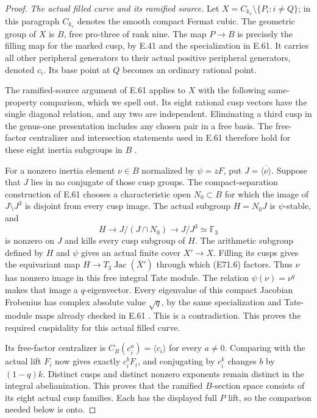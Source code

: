 \begin{proof}
\emph{The actual filled curve and its ramified source.}
Let $X=C_{k_v}\setminus\{P_i:i\ne Q\}$; in this paragraph
$C_{k_v}$ denotes the smooth compact Fermat cubic.
The geometric group of $X$ is $B$, free pro-three of rank
nine. The map $P\to B$ is precisely the filling map for
the marked cusp, by E.41 and the specialization in E.61.
It carries all other peripheral generators to their
actual positive peripheral generators, denoted $c_i$.
Its base point at $Q$ becomes an ordinary rational point.

The ramified-source argument of E.61 applies to $X$ with
the following same-property comparison, which we spell out.
Its eight rational cusp vectors have the single diagonal
relation, and any two are independent. Eliminating a third
cusp in the genus-one presentation includes any chosen
pair in a free basis. The free-factor centralizer and
intersection statements used in E.61 therefore hold for
these eight inertia subgroups in $B$
\cite[Theorems A' and B']{A_HerfortRibes1985}.

For a nonzero inertia element $\nu\in B$ normalized by
$\psi=zF$, put $J=\overline{\langle\nu\rangle}$.
Suppose that $J$ lies in no conjugate of those cusp groups.
The compact-separation construction of E.61 chooses a
characteristic open $N_0\subset B$ for which the image
of $J\setminus J^3$ is disjoint from every cusp image.
The actual subgroup $H=N_0J$ is $\psi$-stable, and
\[
 H\longrightarrow J/(J\cap N_0)
                  \longrightarrow J/J^3\simeq\mathbb F_3
 \tag{E71.6}
\]
is nonzero on $J$ and kills every cusp subgroup of $H$.
The arithmetic subgroup defined by $H$ and $\psi$ gives
an actual finite cover $X'\to X$. Filling its cusps gives
the equivariant map
$H\to T_3\operatorname{Jac}(\overline X')$ through which
(E71.6) factors. Thus $\nu$ has nonzero image in this
free integral Tate module. The relation
$\psi(\nu)=\nu^q$ makes that image a $q$-eigenvector.
Every eigenvalue of this compact Jacobian Frobenius has
complex absolute value $\sqrt q$, by the same
specialization and Tate-module maps already checked in
E.61 \cite[II, Theorem1.1(b); III, Proposition9.1]{E_MilneAV2008}.
This is a contradiction. This proves the required
cuspidality for this actual filled curve.

Its free-factor centralizer is
$C_B(c_i^a)=\langle c_i\rangle$ for every $a\ne0$.
Comparing with the actual lift $F_i$ now gives exactly
$c_i^bF_i$, and conjugating by $c_i^k$ changes $b$ by
$(1-q)k$. Distinct cusps and distinct nonzero exponents
remain distinct in the integral abelianization.
This proves that the ramified $B$-section space consists
of its eight actual cusp families. Each has the displayed
full $P$ lift, so the comparison needed below is onto.


\end{proof}
